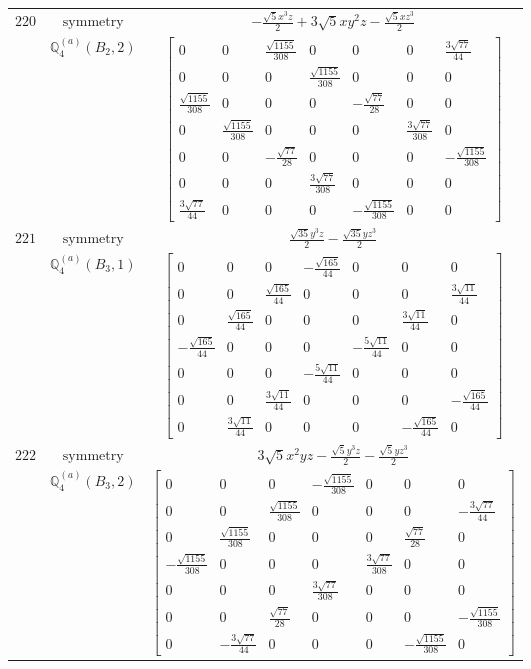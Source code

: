 \documentclass[fleqn,8pt,landscape]{jsarticle}
\begin{document}
\begin{longtable}{ccc}
$ 220 $ & $ \text{symmetry} $ & $ - \frac{\sqrt{5} x^{3} z}{2} + 3 \sqrt{5} x y^{2} z - \frac{\sqrt{5} x z^{3}}{2} $ \\
$  $ & $ \mathbb{Q}_{4}^{(a)}(B_{2},2) $ & $ \begin{bmatrix} 0 & 0 & \frac{\sqrt{1155}}{308} & 0 & 0 & 0 & \frac{3 \sqrt{77}}{44} \\ 0 & 0 & 0 & \frac{\sqrt{1155}}{308} & 0 & 0 & 0 \\ \frac{\sqrt{1155}}{308} & 0 & 0 & 0 & - \frac{\sqrt{77}}{28} & 0 & 0 \\ 0 & \frac{\sqrt{1155}}{308} & 0 & 0 & 0 & \frac{3 \sqrt{77}}{308} & 0 \\ 0 & 0 & - \frac{\sqrt{77}}{28} & 0 & 0 & 0 & - \frac{\sqrt{1155}}{308} \\ 0 & 0 & 0 & \frac{3 \sqrt{77}}{308} & 0 & 0 & 0 \\ \frac{3 \sqrt{77}}{44} & 0 & 0 & 0 & - \frac{\sqrt{1155}}{308} & 0 & 0 \end{bmatrix} $ \\ \hline
$ 221 $ & $ \text{symmetry} $ & $ \frac{\sqrt{35} y^{3} z}{2} - \frac{\sqrt{35} y z^{3}}{2} $ \\
$  $ & $ \mathbb{Q}_{4}^{(a)}(B_{3},1) $ & $ \begin{bmatrix} 0 & 0 & 0 & - \frac{\sqrt{165}}{44} & 0 & 0 & 0 \\ 0 & 0 & \frac{\sqrt{165}}{44} & 0 & 0 & 0 & \frac{3 \sqrt{11}}{44} \\ 0 & \frac{\sqrt{165}}{44} & 0 & 0 & 0 & \frac{3 \sqrt{11}}{44} & 0 \\ - \frac{\sqrt{165}}{44} & 0 & 0 & 0 & - \frac{5 \sqrt{11}}{44} & 0 & 0 \\ 0 & 0 & 0 & - \frac{5 \sqrt{11}}{44} & 0 & 0 & 0 \\ 0 & 0 & \frac{3 \sqrt{11}}{44} & 0 & 0 & 0 & - \frac{\sqrt{165}}{44} \\ 0 & \frac{3 \sqrt{11}}{44} & 0 & 0 & 0 & - \frac{\sqrt{165}}{44} & 0 \end{bmatrix} $ \\ \hline
$ 222 $ & $ \text{symmetry} $ & $ 3 \sqrt{5} x^{2} y z - \frac{\sqrt{5} y^{3} z}{2} - \frac{\sqrt{5} y z^{3}}{2} $ \\
$  $ & $ \mathbb{Q}_{4}^{(a)}(B_{3},2) $ & $ \begin{bmatrix} 0 & 0 & 0 & - \frac{\sqrt{1155}}{308} & 0 & 0 & 0 \\ 0 & 0 & \frac{\sqrt{1155}}{308} & 0 & 0 & 0 & - \frac{3 \sqrt{77}}{44} \\ 0 & \frac{\sqrt{1155}}{308} & 0 & 0 & 0 & \frac{\sqrt{77}}{28} & 0 \\ - \frac{\sqrt{1155}}{308} & 0 & 0 & 0 & \frac{3 \sqrt{77}}{308} & 0 & 0 \\ 0 & 0 & 0 & \frac{3 \sqrt{77}}{308} & 0 & 0 & 0 \\ 0 & 0 & \frac{\sqrt{77}}{28} & 0 & 0 & 0 & - \frac{\sqrt{1155}}{308} \\ 0 & - \frac{3 \sqrt{77}}{44} & 0 & 0 & 0 & - \frac{\sqrt{1155}}{308} & 0 \end{bmatrix} $ \\ \hline

\end{longtable}
\end{document}
